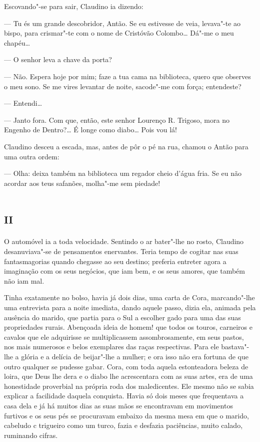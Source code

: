 Escovando"-se para sair, Claudino ia dizendo:

--- Tu és um grande descobridor, Antão. Se eu estivesse de veia,
levava"-te ao bispo, para crismar"-te com o nome de Cristóvão Colombo\ldots{}
Dá"-me o meu chapéu\ldots{}

--- O senhor leva a chave da porta?

--- Não. Espera hoje por mim; faze a tua cama na biblioteca, quero que
observes o meu sono. Se me vires levantar de noite, sacode"-me com força;
entendeste?

--- Entendi\ldots{}

--- Janto fora. Com que, então, este senhor Lourenço R. Trigoso, mora no
Engenho de Dentro?\ldots{} É longe como diabo\ldots{} Pois vou lá!

Claudino desceu a escada, mas, antes de pôr o pé na rua, chamou o Antão
para uma outra ordem:

--- Olha: deixa também na biblioteca um regador cheio d'água fria. Se eu
não acordar aos teus safanões, molha"-me sem piedade!

\section*{\textsc{ii}}

O automóvel ia a toda velocidade. Sentindo o ar bater"-lhe no rosto,
Claudino desanuviava"-se de pensamentos enervantes. Teria tempo de
cogitar nas suas fantasmagorias quando chegasse ao seu destino; preferia
entreter agora a imaginação com os seus negócios, que iam bem, e os seus
amores, que também não iam mal.

Tinha exatamente no bolso, havia já dois dias, uma carta de Cora,
marcando"-lhe uma entrevista para a noite imediata, dando aquele passo,
dizia ela, animada pela ausência do marido, que partia para o Sul a
escolher gado para uma das suas propriedades rurais. Abençoada ideia de
homem! que todos os touros, carneiros e cavalos que ele adquirisse se
multiplicassem assombrosamente, em seus pastos, nos mais numerosos e
belos exemplares das raças respectivas. Para ele bastava"-lhe a glória e
a delícia de beijar"-lhe a mulher; e ora isso não era fortuna de que
outro qualquer se pudesse gabar. Cora, com toda aquela estonteadora
beleza de loira, que Deus lhe dera e o diabo lhe acrescentara com as
suas artes, era de uma honestidade proverbial na própria roda dos
maledicentes. Ele mesmo não se sabia explicar a facilidade daquela
conquista. Havia só dois meses que frequentava a casa dela e já há
muitos dias as suas mãos se encontravam em movimentos furtivos e os seus
pés se procuravam embaixo da mesma mesa em que o marido, cabeludo c
trigueiro como um turco, fazia e desfazia paciências, muito calado,
ruminando cifras.

